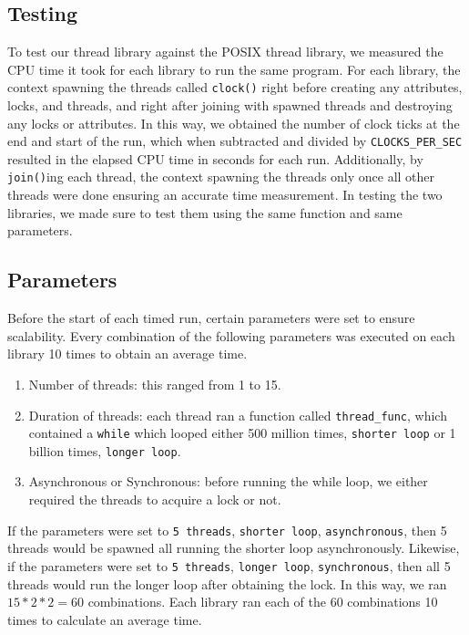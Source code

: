 \documentclass{article}
\begin{document}
\subsection{Testing}
To test our thread library against the POSIX thread library, we measured the CPU time it took for each library to run the same program. For each library, the context spawning the threads called \verb|clock()| right before creating any attributes, locks, and threads, and right after joining with spawned threads and destroying any locks or attributes. In this way, we obtained the number of clock ticks at the end and start of the run, which when subtracted and divided by \verb|CLOCKS_PER_SEC| resulted in the elapsed CPU time in seconds for each run. Additionally, by \verb|join()|ing each thread, the context spawning the threads only  once all other threads were done ensuring an accurate time measurement. In testing the two libraries, we made sure to test them using the same function and same parameters. 

\subsection{Parameters}
Before the start of each timed run, certain parameters were set to ensure scalability. Every combination of the following parameters was executed on each library 10 times to obtain an average time.
\begin{enumerate}
    \item Number of threads: this ranged from 1 to 15.  
     \item Duration of threads: each thread ran a function called \verb|thread_func|, which contained a \verb|while| which looped either 500 million times, \verb|shorter loop| or 1 billion times, \verb|longer loop|.
    \item Asynchronous or Synchronous: before running the while loop, we either required the threads to acquire a lock or not. 
\end{enumerate}
 If the parameters were set to \verb|5 threads|, \verb|shorter loop|, \verb|asynchronous|, then 5 threads would be spawned all running the shorter loop asynchronously. Likewise, if the parameters were set to \verb|5 threads|, \verb|longer loop|, \verb|synchronous|, then all 5 threads would run the longer loop after obtaining the lock. In this way, we ran $15*2*2 = 60$ combinations. Each library ran each of the 60 combinations 10 times to calculate an average time. 
\end{document}
